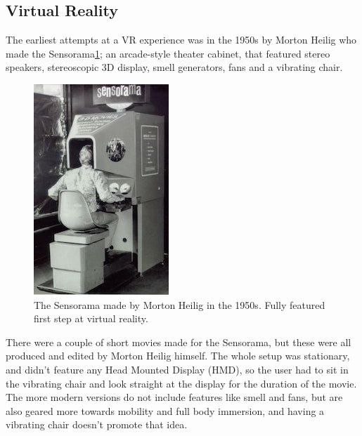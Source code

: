 		\subsection{Virtual Reality}
		The earliest attempts at a VR experience was in the 1950s\cite{VRS} by Morton Heilig who made the Sensorama\ref{fig:sensorama}; an arcade-style theater cabinet, that featured stereo speakers, stereoscopic 3D display, smell generators, fans and a vibrating chair.
		\begin{figure}[H]
			\centering
			\includegraphics[width=0.4\linewidth]{figure/Analysis/sensorama2}
			\caption{The Sensorama made by Morton Heilig in the 1950s. Fully featured first step at virtual reality.}
			\label{fig:sensorama}
		\end{figure}
		There were a couple of short movies made for the Sensorama, but these were all produced and edited by Morton Heilig himself. The whole setup was stationary, and didn't feature any Head Mounted Display (HMD), so the user had to sit in the vibrating chair and look straight at the display for the duration of the movie. The more modern versions do not include features like smell and fans, but are also geared more towards mobility and full body immersion, and having a vibrating chair doesn't promote that idea.\\
		
